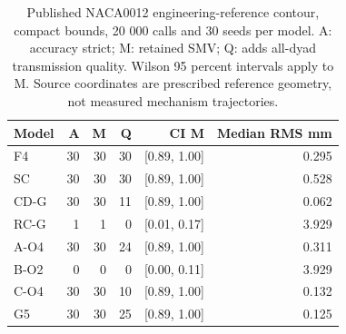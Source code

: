 \begin{table}[H]
\caption{Published NACA0012 engineering-reference contour, compact bounds, 20 000 calls and 30 seeds per model. A: accuracy strict; M: retained SMV; Q: adds all-dyad transmission quality. Wilson 95 percent intervals apply to M. Source coordinates are prescribed reference geometry, not measured mechanism trajectories.}
\label{tab:v2_engineering}
\centering
\small
\begin{tabular}{@{}lrrrrr@{}}
\toprule
Model & A & M & Q & CI M & Median RMS mm \\
\midrule
F4 & 30 & 30 & 30 & [0.89, 1.00] & 0.295 \\
SC & 30 & 30 & 30 & [0.89, 1.00] & 0.528 \\
CD-G & 30 & 30 & 11 & [0.89, 1.00] & 0.062 \\
RC-G & 1 & 1 & 0 & [0.01, 0.17] & 3.929 \\
A-O4 & 30 & 30 & 24 & [0.89, 1.00] & 0.311 \\
B-O2 & 0 & 0 & 0 & [0.00, 0.11] & 3.929 \\
C-O4 & 30 & 30 & 10 & [0.89, 1.00] & 0.132 \\
G5 & 30 & 30 & 25 & [0.89, 1.00] & 0.125 \\
\bottomrule
\end{tabular}
\end{table}
